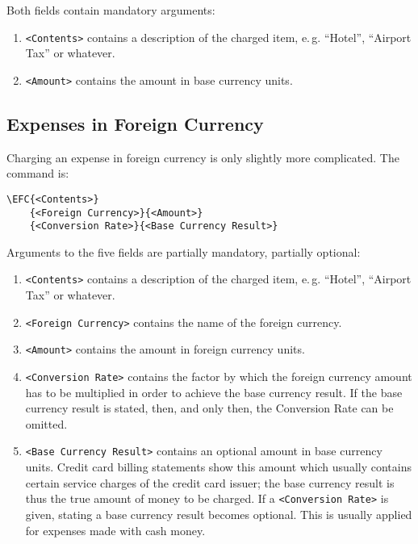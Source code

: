 \documentclass[11pt]{ltxdoc}
\begin{document}
Both fields contain mandatory arguments:

\begin{enumerate}
	\item \texttt{<Contents>} contains a description of the
		charged item, e.\,g. ``Hotel'', ``Airport Tax'' or
		whatever.
	\item \texttt{<Amount>} contains the amount in base currency
		units.
\end{enumerate}


\subsection{Expenses in Foreign Currency}

Charging an expense in foreign currency is only slightly more
complicated. The command is:

\begin{verbatim}
\EFC{<Contents>}
    {<Foreign Currency>}{<Amount>}
    {<Conversion Rate>}{<Base Currency Result>}
\end{verbatim}

Arguments to the five fields are partially mandatory, partially optional:
\begin{enumerate}
	\item \texttt{<Contents>} contains a description of the
		charged item, e.\,g. ``Hotel'', ``Airport Tax'' or
		whatever.

	\item \texttt{<Foreign Currency>} contains the name of the
		foreign currency.

	\item \texttt{<Amount>} contains the amount in foreign currency
		units.
	
	\item \texttt{<Conversion Rate>} contains the factor by
		which the foreign currency amount has to be
		multiplied in order to achieve the base currency
		result. If the base currency result is stated,
		then, and only then, the Conversion Rate can be
		omitted.
	
	\item \texttt{<Base Currency Result>} contains an optional
		amount in base currency units. Credit card billing
		statements show this amount which usually contains
		certain service charges of the credit card issuer;
		the base currency result is thus the true amount of
		money to be charged. If a \texttt{<Conversion Rate>}
		is given, stating a base currency result becomes
		optional. This is usually applied for expenses made
		with cash money.
\end{enumerate}
\end{document}
